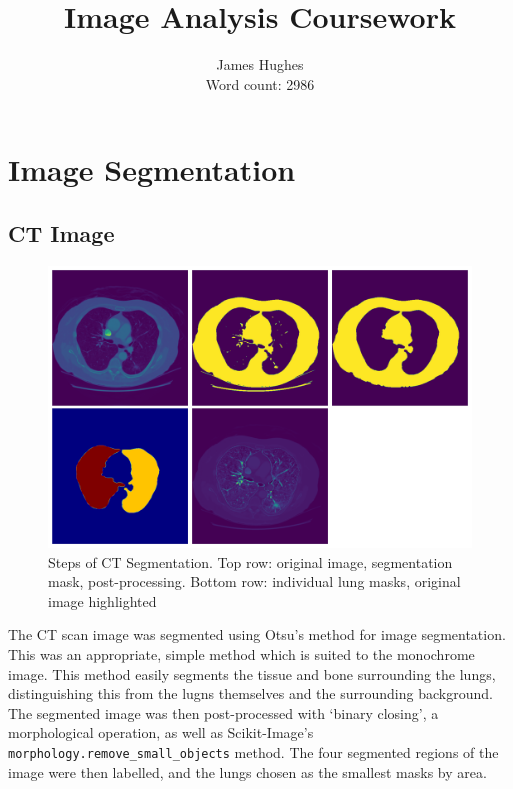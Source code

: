 \documentclass[12pt]{article}
\title{\textbf{Image Analysis Coursework}}
\author{James Hughes\\ Word count: 2986}
\begin{document}
\maketitle

\newpage

\tableofcontents

\newpage

\section{Image Segmentation}

\subsection{CT Image}

\begin{figure}[htp]
    \includegraphics[scale=0.35, center]{figures/ct_segmentation.png}
    \caption{Steps of CT Segmentation. Top row: original image, segmentation mask, post-processing. Bottom row: individual lung masks, original image highlighted}
    \label{fig:ct}
\end{figure}

The CT scan image was segmented using Otsu's method for image segmentation.
This was an appropriate, simple method which is suited to the monochrome image.
This method easily segments the tissue and bone surrounding the lungs,
distinguishing this from the lugns themselves and the surrounding background.
The segmented image was then post-processed with `binary closing', a morphological operation,
as well as Scikit-Image's \texttt{morphology.remove\_small\_objects} method.
The four segmented regions of the image were then labelled, and the lungs chosen as the smallest masks by area.
\end{document}
